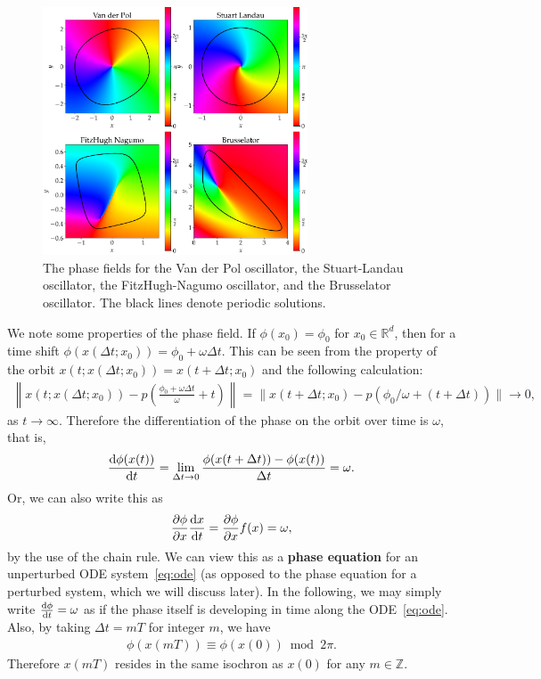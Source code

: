 \begin{figure}[htbp]
  \centering
  \includegraphics[width=0.7\textwidth]{figs/isochronous_map.pdf}
  \caption{The phase fields for the Van der Pol oscillator, the Stuart-Landau oscillator, the FitzHugh-Nagumo oscillator, and the Brusselator oscillator.
  The black lines denote periodic solutions.}
  \label{fig:isochronous_map}
\end{figure}

We note some properties of the phase field.
If $\phi(x_{0})=\phi_{0}$ for $x_{0}\in\mathbb{R}^{d}$,
then for a time shift $\phi(x(\Delta t;x_{0}))=\phi_{0}+\omega\Delta t$.
This can be seen from the property of the orbit $x(t;x(\Delta t; x_{0}))=x(t+\Delta t; x_{0})$ and the following calculation:
\begin{align}
\left\|x(t;x(\Delta t; x_{0}))-p\left(\frac{\phi_{0}+\omega\Delta t}{\omega}+t\right)\right\|
=\|x(t+\Delta t; x_{0})-p(\phi_{0}/\omega+(t+\Delta t))\|\to 0,
\end{align}
as $t\to\infty$.
Therefore the differentiation of the phase on the orbit over time is $\omega$, that is,
\begin{align}
  \frac{\mathrm{d}\phi(x(t))}{\mathrm{d} t}=\lim_{\Delta t\to 0}\frac{\phi(x(t+\Delta t))- \phi(x(t))}{\Delta t}=\omega.
  \label{eq:unperturbed-phase-diff}
\end{align}
Or, we can also write this as
\begin{align}
  \frac{\partial\phi}{\partial x}\frac{\mathrm{d} x}{\mathrm{d} t}=\frac{\partial\phi}{\partial x}f(x)=\omega,
  \label{eq:unperturbed-phase-diff-2}
\end{align}
by the use of the chain rule.
We can view this as a \textbf{phase equation} for an unperturbed ODE system~\eqref{eq:ode} (as opposed to the phase equation for a perturbed system, which we will discuss later).
In the following, we may simply write $\frac{\mathrm{d}\phi}{\mathrm{d} t}=\omega$ as if the phase itself is developing in time along the ODE~\eqref{eq:ode}.
Also, by taking $\Delta t=mT$ for integer $m$, we have
\begin{align}
  \phi(x(mT))\equiv\phi(x(0)) \bmod 2\pi.
\end{align}
Therefore $x(mT)$ resides in the same isochron as $x(0)$ for any $m\in\mathbb{Z}$.

